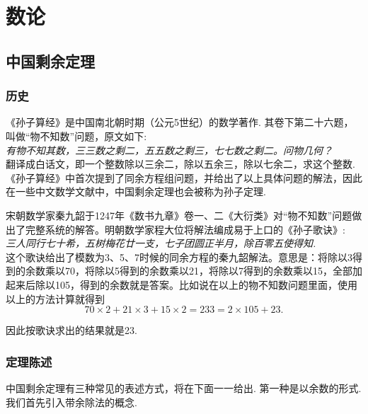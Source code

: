 \documentclass[color=green,mathpazo,titlestyle=hang]{elegantbook}
\author{Huyi Chen}
\begin{document}
\maketitle
\tableofcontents
\mainmatter

\chapter{数论}

\section{中国剩余定理}

\subsection{历史}
《孙子算经》是中国南北朝时期（公元5世纪）的数学著作\cite{szsj}. 其卷下第二十六题，叫做“物不知数”问题，原文如下:\\ 

\emph{有物不知其数，三三数之剩二，五五数之剩三，七七数之剩二。问物几何？}\\ 


翻译成白话文，即一个整数除以三余二，除以五余三，除以七余二，求这个整数.《孙子算经》中首次提到了同余方程组问题，并给出了以上具体问题的解法，因此在一些中文数学文献中，中国剩余定理也会被称为孙子定理.

宋朝数学家秦九韶于1247年《数书九章》卷一、二《大衍类》对“物不知数”问题做出了完整系统的解答。明朝数学家程大位将解法编成易于上口的《孙子歌诀》\cite{szgj}:\\ 

\emph{三人同行七十希，五树梅花廿一支，七子团圆正半月，除百零五使得知.}\\

这个歌诀给出了模数为3、5、7时候的同余方程的秦九韶解法。意思是：将除以3得到的余数乘以70，将除以5得到的余数乘以21，将除以7得到的余数乘以15，全部加起来后除以105，得到的余数就是答案。比如说在以上的物不知数问题里面，使用以上的方法计算就得到
\[ 70\times 2+21\times 3+15\times 2=233=2\times 105+23.\] 

因此按歌诀求出的结果就是23.



\subsection{定理陈述}
  中国剩余定理有三种常见的表述方式，将在下面一一给出.
  第一种是以余数的形式.我们首先引入带余除法的概念.
  
\end{document}
